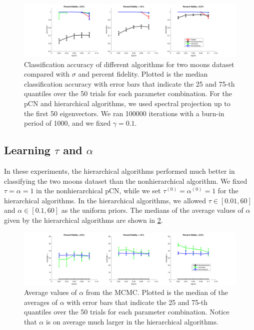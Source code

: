 \documentclass{siamart1116}
\begin{document}
    \begin{figure}[!htb]
    \label{fig:compare_hier}
    \caption{Classification accuracy of different algorithms for two moons dataset compared with $\sigma$ and percent fidelity. Plotted is the median classification accuracy with error bars that indicate the 25 and 75-th quantiles over the 50 trials for each parameter combination. For the pCN and hierarchical algorithms, we used spectral projection up to the first 50 eigenvectors. We ran 100000 iterations with a burn-in period of 1000, and we fixed $\gamma = 0.1$.}
    \includegraphics[width=\linewidth]{compare/summary.png}
    \end{figure}

    \subsection{Learning $\tau$ and $\alpha$}
        In these experiments, the hierarchical algorithms performed much better in classifying the two moons dataset than the nonhierarchical algorithm. We fixed $\tau=\alpha=1$ in the nonhierarchical pCN, while we set $\tau^{(0)}=\alpha^{(0)} = 1$ for the hierarchical algorithms. In the hierarchical algorithms, we allowed $\tau \in [0.01,60]$ and $\alpha \in [0.1,60]$ as the uniform priors. The medians of the average values of $\alpha$ given by the hierarchical algorithms are shown in \cref{fig:compare_alpha}.
        \begin{figure}[!htb]
        \label{fig:compare_alpha}
        \caption{Average values of $\alpha$ from the MCMC. Plotted is the median of the averages of $\alpha$ with error bars that indicate the 25 and 75-th quantiles over the 50 trials for each parameter combination. Notice that $\alpha$ is on average much larger in the hierarchical algorithms.}
        \includegraphics[width=\linewidth]{compare/alpha_averages.png}
        \end{figure}
\end{document}
